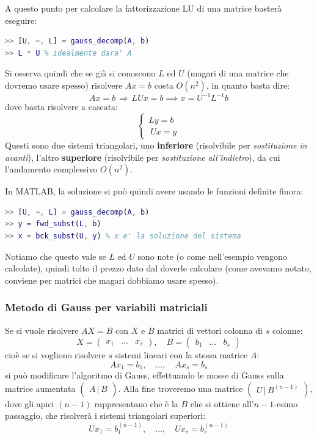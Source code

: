 \documentclass[a4paper,11pt]{article}
\begin{document}
A questo punto per calcolare la fattorizzazione LU di una matrice basterà eseguire:
\begin{lstlisting}[language=matlab, style=codestyle]	
>> [U, ~, L] = gauss_decomp(A, b)
>> L * U % idealmente dara' A
\end{lstlisting}

\par\medskip

Si osserva quindi che se già si conoscono $L$ ed $U$ (magari di una matrice che dovremo usare spesso) risolvere $Ax = b$ costa $O(n^2)$, in quanto basta dire:
$$
Ax = b \, \Rightarrow \, LUx = b \implies x = U^{-1} L^{-1} b
$$
dove basta risolvere a cascata:
\[
	\begin{cases}
		Ly = b \\\
		Ux = y
	\end{cases}
\]
Questi sono due sistemi triangolari, uno \textbf{inferiore} (risolvibile per \textit{sostituzione in avanti}), l'altro \textbf{superiore} (risolvibile per \textit{sostituzione all'indietro}), da cui l'andamento complessivo $O(n^2)$.

In MATLAB, la soluzione si può quindi avere usando le funzioni definite finora:
\begin{lstlisting}[language=matlab, style=codestyle]	
>> [U, ~, L] = gauss_decomp(A, b)
>> y = fwd_subst(L, b)
>> x = bck_subst(U, y) % x e' la soluzione del sistema
\end{lstlisting}

Notiamo che questo vale se $L$ ed $U$ sono note (o come nell'esempio vengono calcolate), quindi tolto il prezzo dato dal doverle calcolare (come avevamo notato, conviene per matrici che magari dobbiamo usare spesso).

\subsubsection{Metodo di Gauss per variabili matriciali}
Se si vuole risolvere $AX = B$ con $X$ e $B$ matrici di vettori colonna di $s$ colonne:
$$
X = \begin{pmatrix}
	x_1 & ... & x_s
\end{pmatrix}, \quad
B = \begin{pmatrix}
	b_1 & ... & b_s
\end{pmatrix}
$$
cioè se si vogliono risolvere $s$ sistemi lineari con la stessa matrice $A$:
$$
Ax_1 = b_1, \quad ..., \quad Ax_s = b_s
$$
si può modificare l'algoritmo di Gauss, effettuando le mosse di Gauss sulla matrice aumentata $\begin{pmatrix}
	A \, | \, B
\end{pmatrix}$.
Alla fine troveremo una matrice $\begin{pmatrix}
	U \, | \, B^{(n - 1)}
\end{pmatrix}$, dove gli apici $(n - 1)$ rappresentano che è la $B$ che si ottiene all'$n-1$-esimo passaggio, che risolverà i sistemi triangolari superiori:
$$
Ux_1 = b_1^{(n - 1)}, \quad ..., \quad Ux_s = b_s^{(n - 1)}
$$
\end{document}
